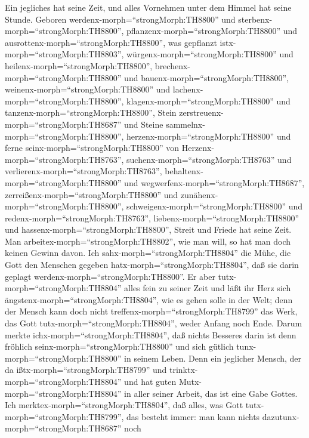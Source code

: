  Ein jegliches hat seine Zeit, und alles Vornehmen unter dem
Himmel hat seine Stunde.  Geboren
werdenx-morph=``strongMorph:TH8800'' und
sterbenx-morph=``strongMorph:TH8800'',
pflanzenx-morph=``strongMorph:TH8800'' und
ausrottenx-morph=``strongMorph:TH8800'', was gepflanzt
istx-morph=``strongMorph:TH8803'', 
würgenx-morph=``strongMorph:TH8800'' und
heilenx-morph=``strongMorph:TH8800'',
brechenx-morph=``strongMorph:TH8800'' und
bauenx-morph=``strongMorph:TH8800'', 
weinenx-morph=``strongMorph:TH8800'' und
lachenx-morph=``strongMorph:TH8800'',
klagenx-morph=``strongMorph:TH8800'' und
tanzenx-morph=``strongMorph:TH8800'',  Stein
zerstreuenx-morph=``strongMorph:TH8687'' und Steine
sammelnx-morph=``strongMorph:TH8800'',
herzenx-morph=``strongMorph:TH8800'' und ferne
seinx-morph=``strongMorph:TH8800'' von
Herzenx-morph=``strongMorph:TH8763'', 
suchenx-morph=``strongMorph:TH8763'' und
verlierenx-morph=``strongMorph:TH8763'',
behaltenx-morph=``strongMorph:TH8800'' und
wegwerfenx-morph=``strongMorph:TH8687'', 
zerreißenx-morph=``strongMorph:TH8800'' und
zunähenx-morph=``strongMorph:TH8800'',
schweigenx-morph=``strongMorph:TH8800'' und
redenx-morph=``strongMorph:TH8763'', 
liebenx-morph=``strongMorph:TH8800'' und
hassenx-morph=``strongMorph:TH8800'', Streit und Friede hat seine Zeit.
 Man arbeitex-morph=``strongMorph:TH8802'', wie man will, so
hat man doch keinen Gewinn davon.  Ich
sahx-morph=``strongMorph:TH8804'' die Mühe, die Gott den Menschen
gegeben hatx-morph=``strongMorph:TH8804'', daß sie darin geplagt
werdenx-morph=``strongMorph:TH8800''.  Er aber
tutx-morph=``strongMorph:TH8804'' alles fein zu seiner Zeit und läßt ihr
Herz sich ängstenx-morph=``strongMorph:TH8804'', wie es gehen solle in
der Welt; denn der Mensch kann doch nicht
treffenx-morph=``strongMorph:TH8799'' das Werk, das Gott
tutx-morph=``strongMorph:TH8804'', weder Anfang noch Ende. 
Darum merkte ichx-morph=``strongMorph:TH8804'', daß nichts Besseres
darin ist denn fröhlich seinx-morph=``strongMorph:TH8800'' und sich
gütlich tunx-morph=``strongMorph:TH8800'' in seinem Leben. 
Denn ein jeglicher Mensch, der da ißtx-morph=``strongMorph:TH8799'' und
trinktx-morph=``strongMorph:TH8804'' und hat guten
Mutx-morph=``strongMorph:TH8804'' in aller seiner Arbeit, das ist eine
Gabe Gottes.  Ich merktex-morph=``strongMorph:TH8804'', daß
alles, was Gott tutx-morph=``strongMorph:TH8799'', das besteht immer:
man kann nichts dazutunx-morph=``strongMorph:TH8687'' noch
